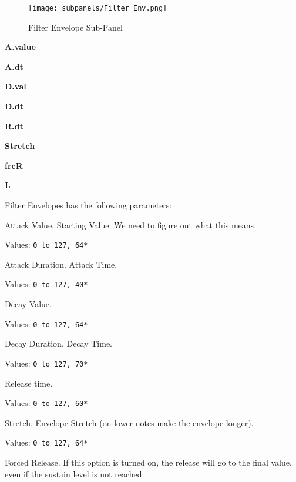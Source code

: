 \begin{figure}[H]
   \centering 
   \texttt{[image: subpanels/Filter\_Env.png]}
   \caption[Filter Envelope Sub-Panel]{Filter Envelope Sub-Panel}
   \label{fig:filter_env}
\end{figure}

   \begin{enumber}
      \item \textbf{A.value}
      \item \textbf{A.dt}
      \item \textbf{D.val}
      \item \textbf{D.dt}
      \item \textbf{R.dt}
      \item \textbf{Stretch}
      \item \textbf{frcR}
      \item \textbf{L}
   \end{enumber}

   Filter Envelopes has the following parameters:

   \setcounter{ItemCounter}{0}      %

   Attack Value.  Starting Value.
   We need to figure out what this means.

   Values: \texttt{0 to 127, 64*}

   Attack Duration.  Attack Time.

   Values: \texttt{0 to 127, 40*}

   Decay Value.

   Values: \texttt{0 to 127, 64*}

   Decay Duration.  Decay Time.

   Values: \texttt{0 to 127, 70*}

   Release time.

   Values: \texttt{0 to 127, 60*}

   Stretch.
   Envelope Stretch (on lower notes make the envelope longer).

   Values: \texttt{0 to 127, 64*}

   Forced Release.
   If this option is turned on, the release will go to the
   final value, even if the sustain level is not reached.

